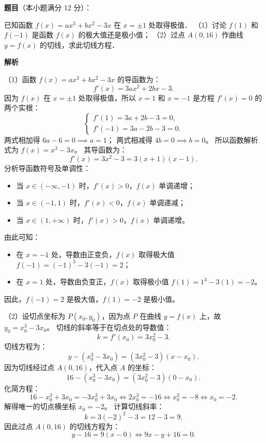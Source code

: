 \begin{answer}

\textbf{题目}（本小题满分 12 分）：

已知函数 $f(x) = ax^3 + bx^2 - 3x$ 在 $x = \pm 1$ 处取得极值．
（1）讨论 $f(1)$ 和 $f(-1)$ 是函数 $f(x)$ 的极大值还是极小值；
（2）过点 $A(0, 16)$ 作曲线 $y = f(x)$ 的切线，求此切线方程．

\textbf{解析}

（1）函数 $f(x) = ax^3 + bx^2 - 3x$ 的导函数为：
\nopagebreak[4]
\[
f'(x) = 3ax^2 + 2bx - 3.
\]
因为 $f(x)$ 在 $x = \pm 1$ 处取得极值，所以 $x = 1$ 和 $x = -1$ 是方程 $f'(x) = 0$ 的两个实根：
\nopagebreak[4]
\[
\begin{cases}
f'(1) = 3a + 2b - 3 = 0, \\
f'(-1) = 3a - 2b - 3 = 0.
\end{cases}
\]
两式相加得 $6a - 6 = 0 \implies a = 1$；
两式相减得 $4b = 0 \implies b = 0$。
所以函数解析式为 $f(x) = x^3 - 3x$。
其导函数为：
\nopagebreak[4]
\[
f'(x) = 3x^2 - 3 = 3(x+1)(x-1).
\]
分析导函数符号及单调性：
\begin{itemize}
\item 当 $x \in (-\infty, -1)$ 时，$f'(x) > 0$，$f(x)$ 单调递增；
\item 当 $x \in (-1, 1)$ 时，$f'(x) < 0$，$f(x)$ 单调递减；
\item 当 $x \in (1, +\infty)$ 时，$f'(x) > 0$，$f(x)$ 单调递增。
\end{itemize}
由此可知：
\begin{itemize}
\item 在 $x = -1$ 处，导数由正变负，$f(x)$ 取得极大值 $f(-1) = (-1)^3 - 3(-1) = 2$；
\item 在 $x = 1$ 处，导数由负变正，$f(x)$ 取得极小值 $f(1) = 1^3 - 3(1) = -2$。
\end{itemize}

因此，$f(-1) = 2$ 是极大值，$f(1) = -2$ 是极小值。

（2）设切点坐标为 $P(x_0, y_0)$，因为点 $P$ 在曲线 $y = f(x)$ 上，故 $y_0 = x_0^3 - 3x_0$。
切线的斜率等于在切点处的导数值：
\nopagebreak[4]
\[
k = f'(x_0) = 3x_0^2 - 3.
\]
切线方程为：
\nopagebreak[4]
\[
y - (x_0^3 - 3x_0) = (3x_0^2 - 3)(x - x_0).
\]
因为切线经过点 $A(0, 16)$，代入点 $A$ 的坐标：
\nopagebreak[4]
\[
16 - (x_0^3 - 3x_0) = (3x_0^2 - 3)(0 - x_0).
\]
化简方程：
\nopagebreak[4]
\[
16 - x_0^3 + 3x_0 = -3x_0^3 + 3x_0 \iff 2x_0^3 = -16 \iff x_0^3 = -8 \iff x_0 = -2.
\]
解得唯一的切点横坐标 $x_0 = -2$。
计算切线斜率：
\nopagebreak[4]
\[
k = 3(-2)^2 - 3 = 12 - 3 = 9.
\]
因此过点 $A(0, 16)$ 的切线方程为：
\nopagebreak[4]
\[
y - 16 = 9(x - 0) \iff 9x - y + 16 = 0.
\]


\end{answer}
